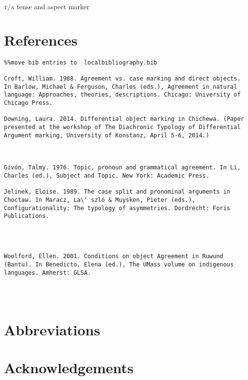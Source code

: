 \documentclass[output=paper]{langsci/langscibook}
\begin{document}
{\textsc{t}}/{\textsc{a  }}tense and aspect marker

\section {References}

\begin{verbatim}%%move bib entries to  localbibliography.bib

Croft, William. 1988. Agreement vs. case marking and direct objects. In Barlow, Michael & Ferguson, Charles (eds.), Agreement in natural language: Approaches, theories, descriptions. Chicago: University of Chicago Press.

Downing, Laura. 2014. Differential object marking in Chichewa. (Paper presented at the workshop of The Diachronic Typology of Differential Argument marking, University of Konstanz, April 5-6, 2014.)



Givón, Talmy. 1976. Topic, pronoun and grammatical agreement. In Li, Charles (ed.), Subject and Topic. New York: Academic Press.

Jelinek, Eloise. 1989. The case split and pronominal arguments in Choctaw. In Maracz, La\' szló & Muysken, Pieter (eds.), Configurationality: The typology of asymmetries. Dordrecht: Foris Publications.




Woolford, Ellen. 2001. Conditions on object Agreement in Ruwund (Bantu). In Benedicto, Elena (ed.), The UMass volume on indigenous languages. Amherst: GLSA.




\end{verbatim}

\section*{Abbreviations}
\section*{Acknowledgements}

\printbibliography[heading=subbibliography,notkeyword=this]
\end{document}

